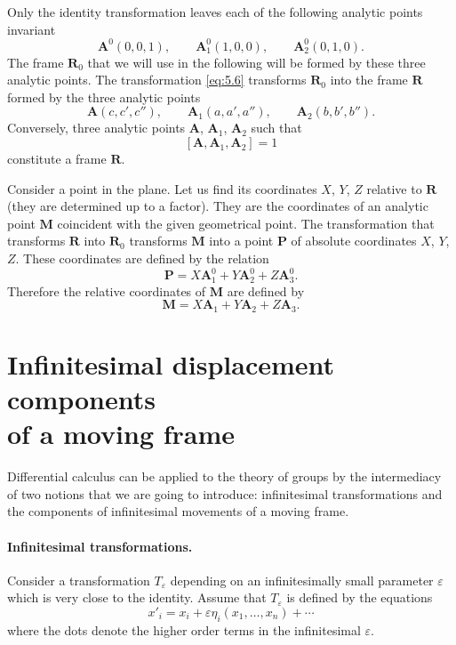\documentclass[leqno,11pt]{book}
\makeatletter
\numberwithin{equation}{chapter}
\theoremstyle{shape1}
\theoremstyle{shapesmall}
\let\old@epsilon\epsilon
\let\old@varepsilon\varepsilon
\let\epsilon\old@varepsilon
\let\varepsilon\old@epsilon
\makeatother
\begin{document}
Only the identity transformation leaves each of the following analytic points invariant
\[
\mathbf{A}^{0}(0,0,1),\qquad
\mathbf{A}^{0}_{1}(1,0,0),\qquad
\mathbf{A}^{0}_{2}(0,1,0).
\]
The frame $\mathbf{R}_{0}$ that we will use in the following will be formed by these three analytic points. The transformation \eqref{eq:5.6} transforms $\mathbf{R}_{0}$ into the frame $\mathbf{R}$ formed by the three analytic points
\[
\mathbf{A}(c,c',c''),\qquad
\mathbf{A}_{1}(a,a',a''),\qquad
\mathbf{A}_{2}(b,b',b'').
\]
Conversely, three analytic points $\mathbf{A}$, $\mathbf{A}_{1}$, $\mathbf{A}_{2}$ such that
\[
[\mathbf{A},\mathbf{A}_{1},\mathbf{A}_{2}]=1
\]
constitute a frame $\mathbf{R}$.

Consider a point in the plane. Let us find its coordinates $X$, $Y$, $Z$ relative to $\mathbf{R}$ (they are determined up to a factor). They are the coordinates of an analytic point $\mathbf{M}$ coincident with the given geometrical point. The transformation that transforms $\mathbf{R}$ into $\mathbf{R}_{0}$ transforms $\mathbf{M}$ into a point $\mathbf{P}$ of absolute coordinates $X$, $Y$, $Z$. These coordinates are defined by the relation
\[
\mathbf{P}=X\mathbf{A}^{0}_{1}+Y\mathbf{A}^{0}_{2}+Z\mathbf{A}^{0}_{3}.
\]
Therefore the relative coordinates of $\mathbf{M}$ are defined by
\[
\mathbf{M}=X\mathbf{A}_{1}+Y\mathbf{A}_{2}+Z\mathbf{A}_{3}.
\]


\section[{Infinitesimal displacement components of a moving frame}]{Infinitesimal displacement components\\of a moving frame}
\label{sec:comp-infin-displ}

Differential calculus can be applied to the theory of groups by the intermediacy of two notions that we are going to introduce: infinitesimal transformations and the components of infinitesimal movements of a moving frame.

\paragraph{Infinitesimal transformations.}
\label{sec:68}
Consider a transformation $T_{\epsilon}$ depending on an infinitesimally small parameter $\epsilon$ which is very close to the identity. Assume that $T_{\epsilon}$ is defined by the equations
\begin{equation}
  \label{eq:5.7}
  x'_{i}=x_{i}+\epsilon\eta_{i}(x_{1},\dots,x_{n})+\cdots
\end{equation}
where the dots denote the higher order terms in the infinitesimal $\epsilon$.
\end{document}
